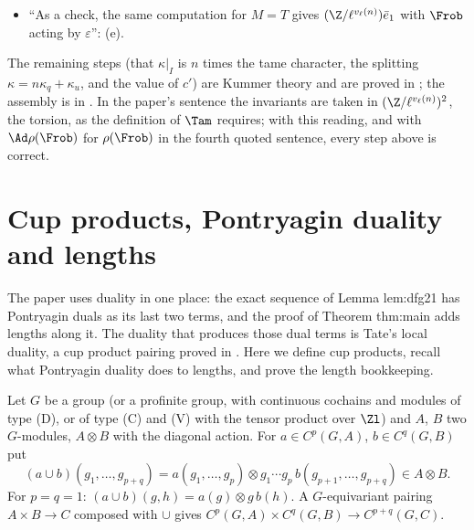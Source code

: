 \begin{paperlink}
\begin{itemize}
multiple of $q-1$)'': (d).
\item ``As a check, the same computation for $M=T$ gives $(\Z/\ell^{v_\ell(n)})\bar e_1$ with $\Frob$ acting by $\varepsilon$'': (e).
\end{itemize}
The remaining steps (that $\kappa|_I$ is $n$ times the tame character, the splitting $\kappa=n\kappa_q+\kappa_u$, and the value of $c'$) are Kummer theory and are proved in
; the assembly is in . In the paper's sentence the invariants are taken in $(\Z/\ell^{v_\ell(n)})^2$, the torsion, as the definition of
$\Tam$ requires; with this reading, and with $\Ad\rho(\Frob)$ for $\rho(\Frob)$ in the fourth quoted sentence, every step above is correct.
\end{paperlink}

\section{Cup products, Pontryagin duality and lengths}\label{sec:cohomology:cup}

The paper uses duality in one place: the exact sequence of Lemma lem:dfg21 has Pontryagin duals as its last two terms, and the proof of Theorem thm:main
adds lengths along it. The duality that produces those dual terms is Tate's local duality, a cup product pairing proved in . Here we define
cup products, recall what Pontryagin duality does to lengths, and prove the length bookkeeping.

\begin{definition}\label{def:cohomology:cup}
Let $G$ be a group (or a profinite group, with continuous cochains and modules of type (D), or of type (C) and (V) with the tensor product over $\Zl$) and $A$, $B$
two $G$-modules, $A\otimes B$ with the diagonal action. For $a\in C^p(G,A)$, $b\in C^q(G,B)$ put
\[
(a\cup b)(g_1,\dots,g_{p+q})=a(g_1,\dots,g_p)\otimes g_1\cdots g_p\,b(g_{p+1},\dots,g_{p+q})\in A\otimes B .
\]
For $p=q=1$: $(a\cup b)(g,h)=a(g)\otimes g\,b(h)$. A $G$-equivariant pairing $A\times B\to C$ composed with $\cup$ gives $C^p(G,A)\times C^q(G,B)\to C^{p+q}(G,C)$.
\end{definition}

